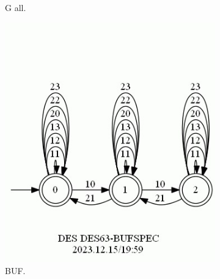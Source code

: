 \documentclass{article}
\begin{document}
\begin{figure}[h!]
\begin{subfigure}{0.2\linewidth}
     \caption{G all.}
  \end{subfigure}
  \begin{subfigure}{0.3\linewidth}
    \includegraphics[width=\linewidth]{assets/DES63-BUFSPEC.jpg}
     \caption{BUF.}
  \end{subfigure}
  \begin{subfigure}{0.2\linewidth}

\end{subfigure}
\end{figure}
\end{document}
